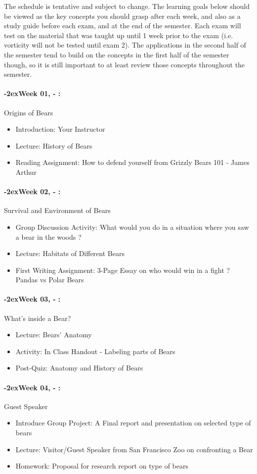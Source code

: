 \documentclass[11pt]{article}
\newcommand{\week}[1]{%
  \paragraph*{\kern-2ex\quad #1, \syldate{\today} - \AdvanceDate[4]\syldate{\today}:}%
  \ifdim\wd1=\wd\MONDAY
    \AdvanceDate[7]
  \else
    \AdvanceDate[7]
  \fi%
}
\begin{document}
The schedule is tentative and subject to change. The learning goals below should be viewed as the key concepts you should grasp after each week, and also as a study guide before each exam, and at the end of the semester. Each exam will test on the material that was taught up until 1 week prior to the exam (i.e. vorticity will not be tested until exam 2). The applications in the second half of the semester tend to build on the concepts in the first half of the semester though, so it is still important to at least review those concepts throughout the semester.

\SetDate[01/01/2018]
\week{Week 01} Origins of Bears
\begin{itemize}
\item Introduction: Your Instructor 
\item Lecture: History of Bears
\item Reading Assignment: How to defend yourself from Grizzly Bears 101 - James Arthur 
\end{itemize}

\week{Week 02} Survival and Environment of Bears
\begin{itemize}
\item Group Discussion Activity: What would you do in a situation where you saw a bear in the woods ?
\item Lecture: Habitats of Different Bears
\item First Writing Assignment: 3-Page Essay on who would win in a fight ? Pandas vs Polar Bears
\end{itemize}

\week{Week 03} What's inside a Bear?
\begin{itemize}
\item Lecture: Bears' Anatomy
\item Activity: In Class Handout - Labeling parts of Bears
\item Post-Quiz: Anatomy and History of Bears
\end{itemize}

\week{Week 04} Guest Speaker
\begin{itemize}
\item Introduce Group Project: A Final report and presentation on selected type of bears
\item Lecture: Visitor/Guest Speaker from San Francisco Zoo on confronting a Bear
\item Homework: Proposal for research report on type of bears
\end{itemize}
\end{document}
